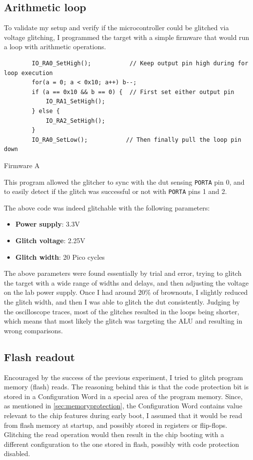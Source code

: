\documentclass[a4paper,english,twoside,10pt]{article}
\begin{document}
\subsection{Arithmetic loop}
To validate my setup and verify if the microcontroller could be glitched via voltage glitching, I programmed the target with a simple firmware that would run a loop with arithmetic operations.
%
\begin{flushleft}
	\captionsetup{type=listing}
	\begin{verbatim}
		IO_RA0_SetHigh();           // Keep output pin high during for loop execution
		for(a = 0; a < 0x10; a++) b--;
		if (a == 0x10 && b == 0) {  // First set either output pin
			IO_RA1_SetHigh();
		} else {
			IO_RA2_SetHigh();
		}
		IO_RA0_SetLow();           // Then finally pull the loop pin down
	\end{verbatim}
	\caption{Firmware A}
\end{flushleft}
%
This program allowed the glitcher to sync with the \gls{dut} sensing \texttt{PORTA} pin 0, and to easily detect if the glitch was successful or not with \texttt{PORTA} pins 1 and 2.

The above code was indeed glitchable with the following parameters:
\begin{itemize}
	\item \textbf{Power supply}: 3.3V
	\item \textbf{Glitch voltage}: 2.25V
	\item \textbf{Glitch width}: 20 Pico cycles
\end{itemize}

The above parameters were found essentially by trial and error, trying to glitch the target with a wide range of widths and delays, and then adjusting the voltage on the lab power supply. Once I had around 20\% of brownouts, I slightly reduced the glitch width, and then I was able to glitch the \gls{dut} consistently.
Judging by the oscilloscope traces, most of the glitches resulted in the loops being shorter, which means that most likely the glitch was targeting the ALU and resulting in wrong comparisons.

\subsection{Flash readout}
Encouraged by the success of the previous experiment, I tried to glitch program memory (flash) reads. The reasoning behind this is that the code protection bit is stored in a Configuration Word in a special area of the program memory. Since, as mentioned in \autoref{sec:memoryprotection}, the Configuration Word contains value relevant to the chip features during early boot, I assumed that it would be read from flash memory at startup, and possibly stored in registers or flip-flops. Glitching the read operation would then result in the chip booting with a different configuration to the one stored in flash, possibly with code protection disabled.
\end{document}
